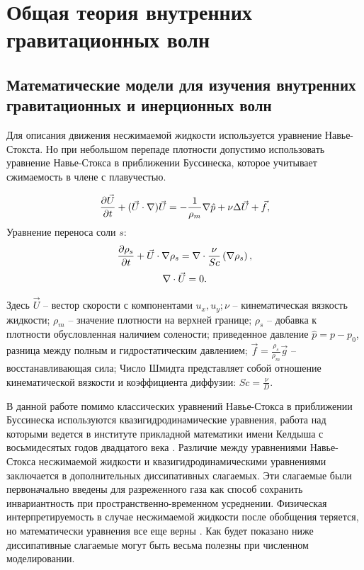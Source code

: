 \chapter{Общая теория внутренних гравитационных волн}
\label{cha:Theory}



\section{Математические модели для изучения внутренних гравитационных и инерционных волн}

Для описания движения несжимаемой жидкости используется уравнение Навье-Стокста. Но при небольшом перепаде плотности допустимо использовать уравнение Навье-Стокса в приближении Буссинеска, которое учитывает сжимаемость в члене с плавучестью.

\begin{equation}
 \large \frac{\partial \vec U}{\partial t} + (\vec U \cdot \nabla) \vec U = - \frac{1}{\rho_m} \nabla \hat p + \nu \Delta \vec U  + \vec f,
 \label{eq:momClassic}
\end{equation}
Уравнение переноса соли $s$:
\begin{equation}
 \large \frac{\partial \rho_s}{\partial t} + \vec U \cdot \nabla \rho_s  = \nabla \cdot \frac{\nu}{Sc} \left ( \nabla \rho_s \right ),
 \label{eq:transClassic}
\end{equation}
\begin{equation}
 \large \nabla \cdot \vec U  = 0.
 \label{eq:contClassic}
\end{equation}

Здесь $\vec{U}$ -- вестор скорости с компонентами $u_x,u_y; \nu$ -- кинематическая вязкость жидкости; $\rho_m$ -- значение плотности на верхней границе; $\rho_s$ -- добавка к плотности обусловленная наличием солености; приведенное давление $\hat{p}=p-p_0$, разница между полным и гидростатическим давлением; $\vec{f}=\frac{\rho_s}{\rho_m} \vec{g}$ -- восстанавливающая сила; Число Шмидта представляет собой отношение кинематической вязкости и коэффициента диффузии:  $Sc = \frac{\nu}{D}$. 

В данной работе помимо классических уравнений Навье-Стокса в приближении Буссинеска используются квазигидродинамические уравнения, работа над которыми ведется в институте прикладной математики имени Келдыша с восьмидесятых годов двадцатого века \cite{bookELIZ}. Различие между уравнениями Навье-Стокса несжимаемой жидкости и квазигидродинамическими уравнениями заключается в дополнительных диссипативных слагаемых. Эти слагаемые были первоначально введены для разреженного газа как способ сохранить инвариантность при пространственно-временном усреднении\cite{AIAAJ1995}. Физическая интерпретируемость в случае несжимаемой жидкости после обобщения теряется, но математически уравнения все еще верны \cite{Elizarova2011}. Как будет показано ниже диссипативные слагаемые могут быть весьма полезны при численном моделировании. 

